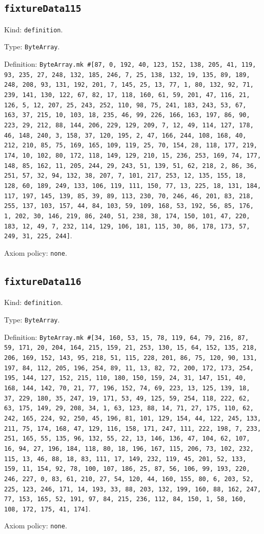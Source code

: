 \documentclass[11pt]{article}
\begin{document}
\subsection*{\texttt{fixtureData115}}
\noindent Kind: \texttt{definition}.\par
\noindent Type: \texttt{ByteArray}.\par
\noindent Definition: \texttt{ByteArray.mk \#[87, 0, 192, 40, 123, 152, 138, 205, 41, 119, 93, 235, 27, 248, 132, 185, 246, 7, 25, 138, 132, 19, 135, 89, 189, 248, 208, 93, 131, 192, 201, 7, 145, 25, 13, 77, 1, 80, 132, 92, 71, 239, 141, 130, 122, 67, 82, 17, 118, 160, 61, 59, 201, 47, 116, 21, 126, 5, 12, 207, 25, 243, 252, 110, 98, 75, 241, 183, 243, 53, 67, 163, 37, 215, 10, 103, 18, 235, 46, 99, 226, 166, 163, 197, 86, 90, 223, 29, 212, 88, 144, 206, 229, 129, 209, 7, 12, 49, 114, 127, 178, 46, 148, 240, 3, 158, 37, 120, 195, 2, 47, 166, 244, 108, 168, 40, 212, 210, 85, 75, 169, 165, 109, 119, 25, 70, 154, 28, 118, 177, 219, 174, 10, 102, 80, 172, 118, 149, 129, 210, 15, 236, 253, 169, 74, 177, 148, 85, 162, 11, 205, 244, 29, 243, 51, 139, 51, 62, 218, 2, 86, 36, 251, 57, 32, 94, 132, 38, 207, 7, 101, 217, 253, 12, 135, 155, 18, 128, 60, 189, 249, 133, 106, 119, 111, 150, 77, 13, 225, 18, 131, 184, 117, 197, 145, 139, 85, 39, 89, 113, 230, 70, 246, 46, 201, 83, 218, 255, 137, 103, 157, 44, 84, 103, 59, 109, 168, 53, 192, 56, 85, 176, 1, 202, 30, 146, 219, 86, 240, 51, 238, 38, 174, 150, 101, 47, 220, 183, 12, 49, 7, 232, 114, 129, 106, 181, 115, 30, 86, 178, 173, 57, 249, 31, 225, 244]}.\par
\noindent Axiom policy: \texttt{none}.\par
\subsection*{\texttt{fixtureData116}}
\noindent Kind: \texttt{definition}.\par
\noindent Type: \texttt{ByteArray}.\par
\noindent Definition: \texttt{ByteArray.mk \#[34, 160, 53, 15, 78, 119, 64, 79, 216, 87, 59, 171, 20, 204, 164, 215, 159, 21, 253, 130, 15, 64, 152, 135, 218, 206, 169, 152, 143, 95, 218, 51, 115, 228, 201, 86, 75, 120, 90, 131, 197, 84, 112, 205, 196, 254, 89, 11, 13, 82, 72, 200, 172, 173, 254, 195, 144, 127, 152, 215, 110, 180, 150, 159, 24, 31, 147, 151, 40, 168, 144, 142, 70, 21, 77, 196, 152, 74, 69, 223, 13, 125, 139, 18, 37, 229, 180, 35, 247, 19, 171, 53, 49, 125, 59, 254, 118, 222, 62, 63, 175, 149, 29, 208, 34, 1, 63, 123, 88, 14, 71, 27, 175, 110, 62, 242, 165, 224, 92, 250, 45, 196, 81, 101, 129, 154, 44, 122, 245, 133, 211, 75, 174, 168, 47, 129, 116, 158, 171, 247, 111, 222, 198, 7, 233, 251, 165, 55, 135, 96, 132, 55, 22, 13, 146, 136, 47, 104, 62, 107, 16, 94, 27, 196, 184, 118, 80, 18, 196, 167, 115, 206, 73, 102, 232, 115, 13, 46, 88, 18, 83, 111, 17, 149, 232, 119, 45, 201, 52, 133, 159, 11, 154, 92, 78, 100, 107, 186, 25, 87, 56, 106, 99, 193, 220, 246, 227, 0, 83, 61, 210, 27, 54, 120, 44, 160, 155, 80, 6, 203, 52, 225, 123, 246, 171, 14, 193, 33, 88, 203, 132, 199, 160, 88, 162, 247, 77, 153, 165, 52, 191, 97, 84, 215, 236, 112, 84, 150, 1, 58, 160, 108, 172, 175, 41, 174]}.\par
\noindent Axiom policy: \texttt{none}.\par
\end{document}
